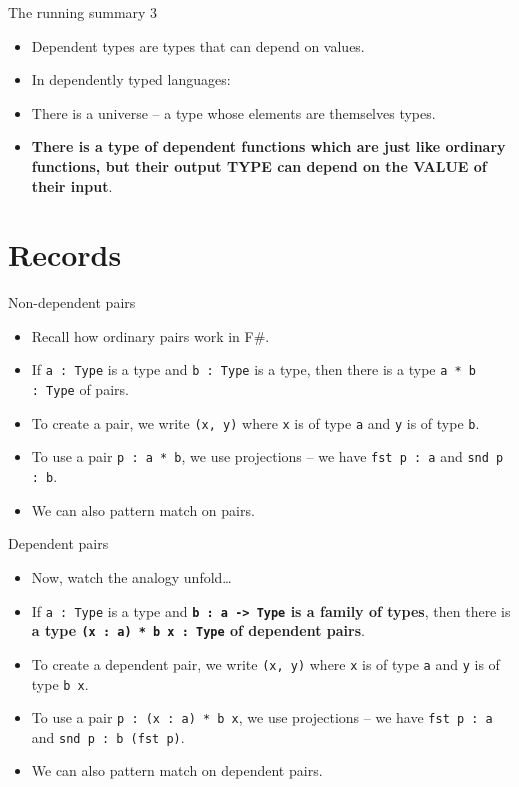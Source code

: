 \documentclass{beamer}
\newcommand{\m}[1]{\texttt{#1}}
\begin{document}
\begin{frame}{The running summary 3}
\begin{itemize}
	\item Dependent types are types that can depend on values.
	\item In dependently typed languages:
	\item There is a universe -- a type whose elements are themselves types.
	\item \textbf{There is a type of dependent functions which are just like ordinary functions, but their output TYPE can depend on the VALUE of their input}.
\end{itemize}
\end{frame}

\section{Records}

\begin{frame}{Non-dependent pairs}
\begin{itemize}
	\item Recall how ordinary pairs work in F\#.
	\item If \m{a :\ Type} is a type and \m{b :\ Type} is a type, then there is a type \m{a * b :\ Type} of pairs.
	\item To create a pair, we write \m{(x, y)} where \m{x} is of type \m{a} and \m{y} is of type \m{b}.
	\item To use a pair \m{p :\ a * b}, we use projections -- we have \m{fst p :\ a} and \m{snd p :\ b}.
	\item We can also pattern match on pairs.
\end{itemize}
\end{frame}

\begin{frame}{Dependent pairs}
\begin{itemize}
	\item Now, watch the analogy unfold\dots
	\item If \m{a :\ Type} is a type and \textbf{\m{b :\ a -> Type} is a family of types}, then there is \textbf{a type \m{(x :\ a) * b x :\ Type} of dependent pairs}.
	\item To create a dependent pair, we write \m{(x, y)} where \m{x} is of type \m{a} and \m{y} is of type \m{b x}.
	\item To use a pair \m{p :\ (x :\ a) * b x}, we use projections -- we have \m{fst p :\ a} and \m{snd p :\ b (fst p)}.
	\item We can also pattern match on dependent pairs.
\end{itemize}
\end{frame}
\end{document}
